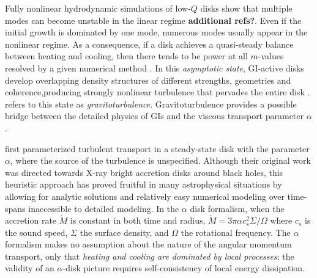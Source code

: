 \documentclass[manuscript]{aastex} %
\begin{document}
Fully nonlinear hydrodynamic simulations of low-$Q$ disks show that multiple
modes can become unstable in the linear regime \citep[e.g.]{nelson1998, pickett1998} {\bf additional refs?}.  Even if the initial growth is dominated by one mode, numerous modes usually appear in the nonlinear regime. As a consequence, if a disk achieves a quasi-steady balance between heating and cooling, then there tends to be power at all $m$-values resolved by a given numerical method \citep{mejia2005,boley2006}.  
In this  {\it asymptotic state}, GI-active disks develop overlapping density structures of different strengths, geometries and coherence,producing strongly nonlinear turbulence that pervades the entire disk \citep[e.g.]{pickett2003, mejia2005,boley2006}.
\citet{gammie2001} refers to this state as {\it gravitoturbulence}. Gravitoturbulence provides a possible bridge between the detailed physics of GIs and the viscous transport parameter $\alpha$. 

\citet{shakura1973} first parameterized turbulent transport in a steady-state disk with the  parameter $\alpha$, where the source of the turbulence is unspecified. Although their original work was directed towards X-ray bright
accretion disks around black holes, this heuristic approach has proved fruitful in many astrophysical situations by allowing for analytic solutions and relatively easy numerical modeling over time-spans inaccessible to detailed modeling. In the $\alpha$ disk formalism, when the accretion rate $\dot{M}$ is constant in both time and radius, $\dot{M} = 3\pi\alpha c_s^2 \Sigma / \Omega$ where $c_s$ is the sound speed, $\Sigma$ the surface density, and $\Omega$ the rotational frequency. The $\alpha$ formalism makes no assumption about the nature of the angular momentum transport, only that {\it heating and cooling are dominated by local processes}; the validity of an $\alpha$-disk picture requires self-consistency of local energy dissipation. 
\end{document}
